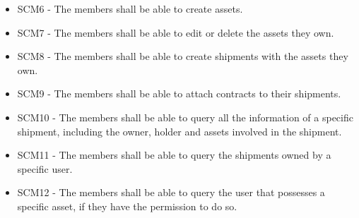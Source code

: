 \begin{itemize}
			\item SCM6 - The members shall be able to create assets.
			\item SCM7 - The members shall be able to edit or delete the assets they own.
			\item SCM8 - The members shall be able to create shipments with the assets they own.
			\item SCM9 - The members shall be able to attach contracts to their shipments.
            \item SCM10 - The members shall be able to query all the information of a specific shipment, including the owner, holder and assets involved in the shipment. %
            \item SCM11 - The members shall be able to query the shipments owned by a specific user. %
            \item SCM12 - The members shall be able to query the user that possesses a specific asset, if they have the permission to do so. %

\end{itemize}
